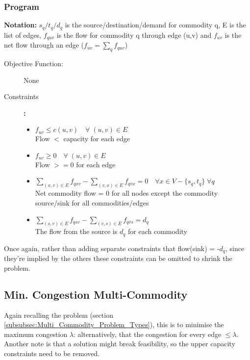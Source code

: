 \subsubsection{Program}
\textbf{Notation:} $s_q/t_q/d_q$ is the source/destination/demand for commodity q, E is the list of edges, $f_{quv}$ is the flow for commodity q through edge (u,v) and $f_{uv}$ is the net flow through an edge ($f_{uv} = \sum_qf_{quv}$)
\begin{description}
\item [Objective Function:] None
\item [Constraints]\textbf{:}  
\begin{itemize}
    \item \(f_{uv} \leq c(u,v) \quad \forall \;(u,v) \in E\) \\ Flow $<$ capacity for each edge
    \item \(f_{uv} \geq 0 \quad \forall \;(u,v) \in E\) \\ Flow $>=0$ for each edge
    \item \(\sum_{(x,v)\in E} f_{qxv} - \sum_{(v,x)\in E} f_{qvx} = 0 \quad \forall x \in V-\{s_q,t_q\}\; \forall q \) \\ Net commodity flow = 0 for all nodes except the commodity source/sink for all commodities/edges
    \item \(\sum_{(s,v)\in E} f_{qsv} - \sum_{(v,s)\in E} f_{qvs} = d_q\) \\ The flow from the source is $d_q$ for each commodity
    \end{itemize}
\end{description}
Once again, rather than adding separate constraints that flow(sink) = -$d_q$, since they're implied by the others these constraints can be omitted to shrink the problem. 

\subsection{Min. Congestion Multi-Commodity}
Again recalling the problem (section \ref{subsubsec:Multi_Commodity_Problem_Types}), this is to minimise the maximum congestion $\lambda$: alternatively, that the congestion for every edge $\leq\lambda$. Another note is that a solution might break feasibility, so the upper capacity constraints need to be removed.

\newpage
